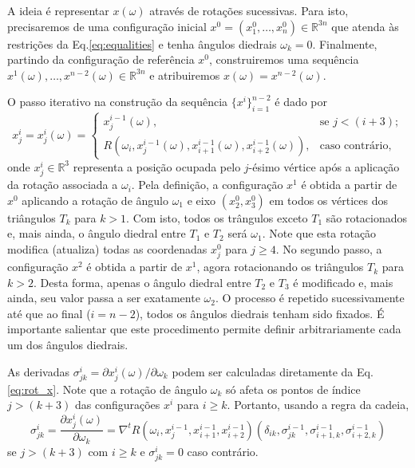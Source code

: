 \documentclass[10pt,a4paper]{article}
\newcommand{\R}{\mathbb{R}}
\begin{document}
A ideia é representar $x(\omega)$ através de rotações sucessivas. Para isto, precisaremos de uma configuração inicial $x^0=(x_1^0,\ldots,x_n^0)\in\R^{3n}$ que atenda às restrições da Eq.\eqref{eq:equalities} e tenha ângulos diedrais $\omega_k=0$. Finalmente, partindo da configuração de referência $x^0$, construiremos uma sequência $x^1(\omega),\ldots,x^{n-2}(\omega)\in\R^{3n}$ e atribuiremos $x(\omega)=x^{n-2}(\omega)$.

O passo iterativo na construção da sequência $\{x^i\}_{i=1}^{n-2}$ é dado por
\begin{equation}\label{eq:rot_x}
x^i_j=x^i_j(\omega)=
\begin{cases}
x^{i-1}_j(\omega),&\mbox{se } j < (i+3);\\
R(\omega_i,x^{i-1}_j(\omega),x^{i-1}_{i+1}(\omega),x^{i-1}_{i+2}(\omega)),&\mbox{caso contrário,}
\end{cases}
\end{equation}
onde $x^i_j\in\R^3$ representa a posição ocupada pelo $j$-ésimo vértice após a aplicação da rotação associada a $\omega_i$. Pela definição, a configuração $x^1$ é obtida a partir de $x^0$ aplicando a rotação de ângulo $\omega_1$ e eixo $(x_2^0,x_3^0)$ em todos os vértices dos triângulos $T_k$ para $k>1$. Com isto, todos os trângulos exceto $T_1$ são rotacionados e, mais ainda, o ângulo diedral entre $T_1$ e $T_2$ será $\omega_1$. Note que esta rotação modifica (atualiza) todas as coordenadas $x_j^0$ para $j\geq 4$. No segundo passo, a configuração $x^2$ é obtida a partir de $x^1$, agora rotacionando os triângulos $T_k$ para $k>2$. Desta forma, apenas o ângulo diedral entre $T_2$ e $T_3$ é modificado e, mais ainda, seu valor passa a ser exatamente $\omega_2$. O processo é repetido sucessivamente até que ao final ($i=n-2$), todos os ângulos diedrais tenham sido fixados. É importante salientar que este procedimento permite definir arbitrariamente cada um dos ângulos diedrais.

As derivadas $\sigma_{jk}^{i}=\partial x_j^i(\omega)/\partial \omega_{k}$ podem ser calculadas diretamente da Eq.\eqref{eq:rot_x}. Note que a rotação de ângulo $\omega_k$ só afeta os pontos de índice $j>(k+3)$ das configurações $x^i$ para $i\geq k$. Portanto, usando a regra da cadeia,
\begin{equation}\label{eq:rot_diff}
\sigma_{jk}^{i}=\frac{\partial x_j^i(\omega)}{\partial \omega_{k}}=
\nabla^t R(\omega_i,x^{i-1}_j,x^{i-1}_{i+1},x^{i-1}_{i+2})(\delta_{ik},\sigma_{jk}^{i-1},\sigma_{{i+1},k}^{i-1},\sigma_{{i+2},k}^{i-1})
\end{equation}
se $j>(k+3)$ com $i\geq k$ e $\sigma^i_{jk}=0$ caso contrário.
\end{document}
